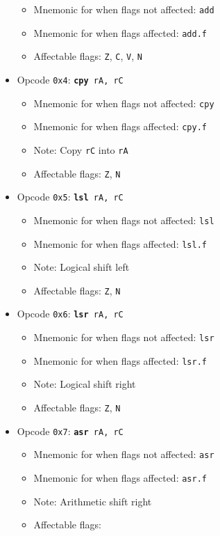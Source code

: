 \documentclass{article}
\begin{document}
\begin{itemize}
\begin{itemize}
			\item Mnemonic for when flags not affected:  \texttt{add}
			\item Mnemonic for when flags affected:  \texttt{add.f}
			\item Affectable flags:
				\texttt{Z}, \texttt{C}, \texttt{V}, \texttt{N}
		\end{itemize}
		\item Opcode \texttt{0x4}:
			\texttt{\textbf{cpy} rA, rC}
		\begin{itemize}
			\item Mnemonic for when flags not affected:  \texttt{cpy}
			\item Mnemonic for when flags affected:  \texttt{cpy.f}
			\item Note:  Copy \texttt{rC} into \texttt{rA}
			\item Affectable flags:
				\texttt{Z}, \texttt{N}
		\end{itemize}
		\item Opcode \texttt{0x5}:
			\texttt{\textbf{lsl} rA, rC}
		\begin{itemize}
			\item Mnemonic for when flags not affected:  \texttt{lsl}
			\item Mnemonic for when flags affected:  \texttt{lsl.f}
			\item Note:  Logical shift left
			\item Affectable flags:
				\texttt{Z}, \texttt{N}
		\end{itemize}
		\item Opcode \texttt{0x6}:
			\texttt{\textbf{lsr} rA, rC}
		\begin{itemize}
			\item Mnemonic for when flags not affected:  \texttt{lsr}
			\item Mnemonic for when flags affected:  \texttt{lsr.f}
			\item Note:  Logical shift right
			\item Affectable flags:
				\texttt{Z}, \texttt{N}
		\end{itemize}
		\item Opcode \texttt{0x7}:
			\texttt{\textbf{asr} rA, rC}
		\begin{itemize}
			\item Mnemonic for when flags not affected:  \texttt{asr}
			\item Mnemonic for when flags affected:  \texttt{asr.f}
			\item Note:  Arithmetic shift right
			\item Affectable flags:

\end{itemize}
\end{itemize}
\end{document}
